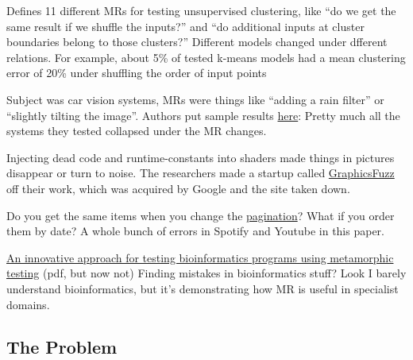 \begin{mldescription}
Defines 11 different MRs for testing unsupervised clustering, like ``do
we get the same result if we shuffle the inputs?'' and ``do additional
inputs at cluster boundaries belong to those clusters?'' Different
models changed under dfferent relations. For example, about 5\% of
tested k-means models had a mean clustering error of 20\% under
shuffling the order of input points

Subject was car vision systems, MRs were things like ``adding a rain
filter'' or ``slightly tilting the image''. Authors put sample results
\href{https://deeplearningtest.github.io/deepTest/}{here}: Pretty much
all the systems they tested collapsed under the MR changes.

Injecting dead code and runtime-constants into shaders made things in
pictures disappear or turn to noise. The researchers made a startup
called
\href{https://web.archive.org/web/20180710214938/http://www.graphicsfuzz.com/}{GraphicsFuzz}
off their work, which was acquired by Google and the site taken down.

Do you get the same items when you change the
\href{https://github.com/spotify/web-api/issues/225}{pagination}? What
if you order them by date? A whole bunch of errors in Spotify and
Youtube in this paper.


\item{\href{https://bmcbioinformatics.biomedcentral.com/articles/10.1186/1471-2105-10-24}{An
innovative approach for testing bioinformatics programs using
metamorphic testing} (pdf, but now not)}
Finding mistakes in bioinformatics stuff? Look I barely understand
bioinformatics, but it's demonstrating how MR is useful in specialist
domains.
\end{mldescription}


\hypertarget{the-problem}{%
\subsection{The Problem}\label{the-problem}}

